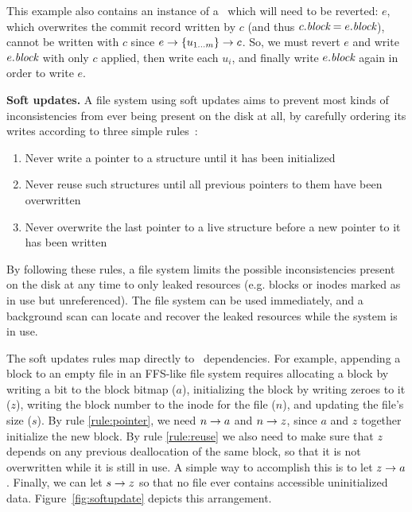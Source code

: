 This example also contains an instance of a \patch\ which will need to be
reverted: $e$, which overwrites the commit record written by $c$ (and thus
$c.\textit{block} = e.\textit{block}$), cannot be written with $c$ since $e \rightarrow
\{u_{1\dots m}\} \rightarrow c$.
%
So, we must revert $e$ and write $e.\textit{block}$ with only $c$ applied, then
write each $u_i$, and finally write $e.\textit{block}$ again in order to write $e$.

\textbf{Soft updates.}
%
A file system using soft updates aims to prevent most kinds of inconsistencies
from ever being present on the disk at all, by carefully ordering its writes
according to three simple rules~\cite{ganger00soft}:

\begin{enumerate}
\item \label{rule:pointer} Never write a pointer to a structure until it has been initialized
\item \label{rule:reuse} Never reuse such structures until all previous pointers to them have been overwritten
\item \label{rule:overwrite} Never overwrite the last pointer to a live structure before a new pointer to it has been written
\end{enumerate}

\noindent
By following these rules, a file system limits the possible inconsistencies
present on the disk at any time to only leaked resources (e.g. blocks or inodes
marked as in use but unreferenced). The file system can be used immediately,
and a background scan can locate and recover the leaked resources while the
system is in use.

The soft updates rules map directly to \patch\ dependencies.
%
For example, appending a block to an empty file in an FFS-like file system
requires allocating a block by writing a bit to the block bitmap ($a$),
initializing the block by writing zeroes to it ($z$), writing the block number
to the inode for the file ($n$), and updating the file's size ($s$).
%
By rule \ref{rule:pointer}, we need $n \rightarrow a$ and $n \rightarrow z$, since
$a$ and $z$ together initialize the new block.
%
By rule \ref{rule:reuse} we also need to make sure that $z$ depends on any
previous deallocation of the same block, so that it is not overwritten while
it is still in use.
%
A simple way to accomplish this is to let $z \rightarrow a$.
%
Finally, we can let $s \rightarrow z$ so that no file ever contains accessible
uninitialized data.
%
Figure~\ref{fig:softupdate} depicts this arrangement.

